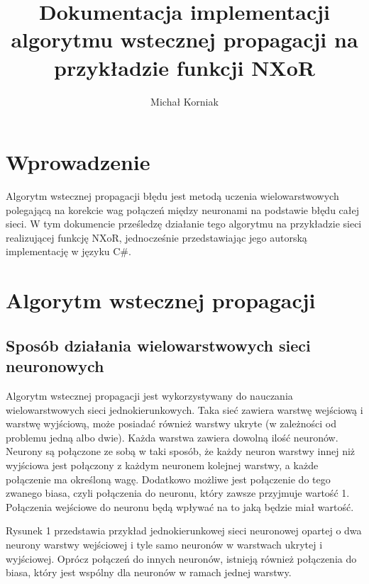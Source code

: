 \documentclass[12pt]{article}
\title{Dokumentacja implementacji algorytmu wstecznej propagacji na przykładzie funkcji NXoR}
\author{Michał Korniak}
\date{}
\begin{document}
\maketitle
\tableofcontents{}
\newpage


\section{Wprowadzenie}
Algorytm wstecznej propagacji błędu jest metodą uczenia wielowarstwowych polegającą na korekcie wag połączeń między neuronami na podstawie błędu całej sieci.
W tym dokumencie prześledzę działanie tego algorytmu na przykładzie sieci realizującej funkcję NXoR,
jednocześnie przedstawiając jego autorską implementację w języku C\#.

\section{Algorytm wstecznej propagacji}
\subsection{Sposób działania wielowarstwowych sieci neuronowych}
Algorytm wstecznej propagacji jest wykorzystywany do nauczania wielowarstwowych sieci jednokierunkowych.
Taka sieć zawiera warstwę wejściową i warstwę wyjściową,
może posiadać również warstwy ukryte (w zależności od problemu jedną albo dwie).
Każda warstwa zawiera dowolną ilość neuronów.
Neurony są połączone ze sobą w taki sposób, że każdy neuron warstwy innej niż wyjściowa jest połączony z każdym neuronem kolejnej warstwy,
a każde połączenie ma określoną wagę.
Dodatkowo możliwe jest połączenie do tego zwanego biasa, czyli połączenia do neuronu, który zawsze przyjmuje wartość 1.
Połączenia wejściowe do neuronu będą wpływać na to jaką będzie miał wartość.

Rysunek 1 przedstawia przykład jednokierunkowej sieci neuronowej opartej o dwa neurony warstwy wejściowej i tyle samo neuronów w warstwach ukrytej i wyjściowej. 
Oprócz połączeń do innych neuronów, istnieją również połączenia do biasa, który jest wspólny dla neuronów w ramach jednej warstwy.
\end{document}
